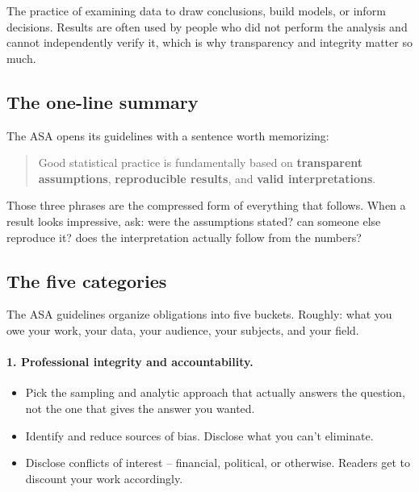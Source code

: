 \documentclass[11pt]{article}
\begin{document}
\begin{defnbox}
The practice of examining data to draw conclusions, build models, or
inform decisions. Results are often used by people who did not
perform the analysis and cannot independently verify it, which is
why transparency and integrity matter so much.
\end{defnbox}

\subsection{The one-line summary}

The ASA opens its guidelines with a sentence worth memorizing:
\begin{quote}
Good statistical practice is fundamentally based on \textbf{transparent
assumptions}, \textbf{reproducible results}, and \textbf{valid
interpretations}.
\end{quote}

Those three phrases are the compressed form of everything that
follows. When a result looks impressive, ask: were the assumptions
stated? can someone else reproduce it? does the interpretation
actually follow from the numbers?

\subsection{The five categories}

The ASA guidelines organize obligations into five buckets. Roughly:
what you owe your work, your data, your audience, your subjects, and
your field.

\paragraph{1. Professional integrity and accountability.}
\begin{itemize}[leftmargin=*,noitemsep]
    \item Pick the sampling and analytic approach that actually
          answers the question, not the one that gives the answer
          you wanted.
    \item Identify and reduce sources of bias. Disclose what you
          can't eliminate.
    \item Disclose conflicts of interest -- financial, political, or
          otherwise. Readers get to discount your work accordingly.
\end{itemize}
\end{document}
